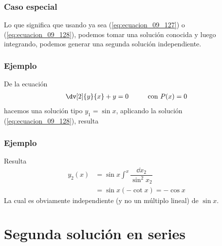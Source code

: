 \begin{frame}
\frametitle{Caso especial}
Lo que significa que usando ya sea (\ref{eq:ecuacion_09_127}) o (\ref{eq:ecuacion_09_128}), podemos tomar una solución conocida y luego integrando, podemos generar una segunda solución independiente.
\end{frame}
\begin{frame}
\frametitle{Ejemplo}
De la ecuación
\begin{align*}
\dv[2]{y}{x} + y = 0 \hspace{1cm} \mbox{con } P(x) = 0
\end{align*}
hacemos una solución tipo $y_{1} = \sin x$, aplicando la solución (\ref{eq:ecuacion_09_128}), resulta
\end{frame}
\begin{frame}
\frametitle{Ejemplo}
Resulta
\begin{align*}
y_{2}(x) &= \sin x \int^{x} \dfrac{\dd{x_{2}}}{\sin^{2} x_{2}} \\
&= \sin x (-\cot x) = - \cos x
\end{align*}
La cual es obviamente independiente (y no un múltiplo lineal) de $\sin x$.
\end{frame}
\section{Segunda solución en series}
